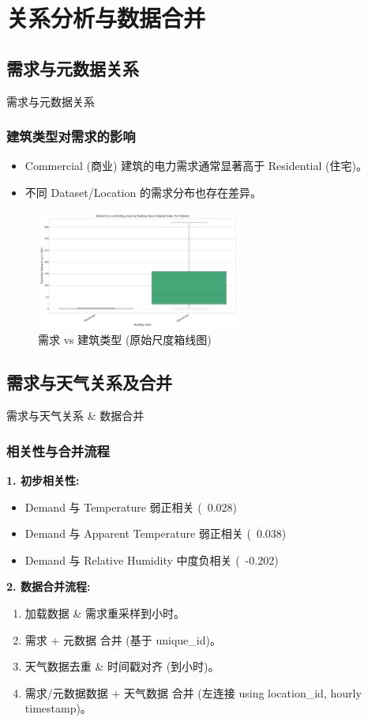 \documentclass{beamer} %
\begin{document}
\section{关系分析与数据合并} %

\subsection{需求与元数据关系} %
\begin{frame}{需求与元数据关系}
    \frametitle{建筑类型对需求的影响}
    \begin{itemize}
        \item Commercial (商业) 建筑的电力需求通常显著高于 Residential (住宅)。
        \item 不同 Dataset/Location 的需求分布也存在差异。
    \end{itemize}
    \begin{figure}[H]
        \centering
        \includegraphics[width=0.6\textwidth]{../plots/demand_vs_building_class_boxplot_orig.png}
        \caption{需求 vs 建筑类型 (原始尺度箱线图)}
    \end{figure}
\end{frame}

\subsection{需求与天气关系及合并} %
\begin{frame}{需求与天气关系 \& 数据合并}
    \frametitle{相关性与合并流程}
    \textbf{1. 初步相关性:}
    \begin{itemize}
        \item Demand 与 Temperature 弱正相关 (~0.028)
        \item Demand 与 Apparent Temperature 弱正相关 (~0.038)
        \item Demand 与 Relative Humidity 中度负相关 (~-0.202)
    \end{itemize}

    \textbf{2. 数据合并流程:}
    \begin{enumerate}
        \item 加载数据 \& 需求重采样到小时。
        \item 需求 + 元数据 合并 (基于 unique\_id)。
        \item 天气数据去重 \& 时间戳对齐 (到小时)。
        \item 需求/元数据数据 + 天气数据 合并 (左连接 using location\_id, hourly timestamp)。
    \end{enumerate}
\end{frame}
\end{document}
